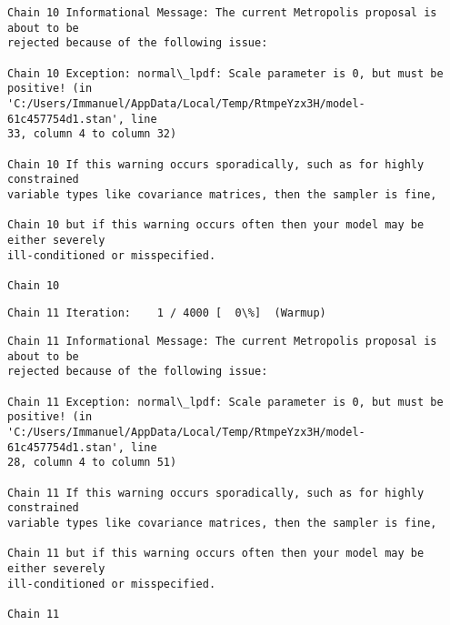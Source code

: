\documentclass[11pt]{article}
\begin{document}
    \begin{Verbatim}[commandchars=\\\{\}]
Chain 10 Informational Message: The current Metropolis proposal is about to be
rejected because of the following issue:

Chain 10 Exception: normal\_lpdf: Scale parameter is 0, but must be positive! (in
'C:/Users/Immanuel/AppData/Local/Temp/RtmpeYzx3H/model-61c457754d1.stan', line
33, column 4 to column 32)

Chain 10 If this warning occurs sporadically, such as for highly constrained
variable types like covariance matrices, then the sampler is fine,

Chain 10 but if this warning occurs often then your model may be either severely
ill-conditioned or misspecified.

Chain 10

    \end{Verbatim}

    \begin{Verbatim}[commandchars=\\\{\}]
Chain 11 Iteration:    1 / 4000 [  0\%]  (Warmup)
    \end{Verbatim}

    \begin{Verbatim}[commandchars=\\\{\}]
Chain 11 Informational Message: The current Metropolis proposal is about to be
rejected because of the following issue:

Chain 11 Exception: normal\_lpdf: Scale parameter is 0, but must be positive! (in
'C:/Users/Immanuel/AppData/Local/Temp/RtmpeYzx3H/model-61c457754d1.stan', line
28, column 4 to column 51)

Chain 11 If this warning occurs sporadically, such as for highly constrained
variable types like covariance matrices, then the sampler is fine,

Chain 11 but if this warning occurs often then your model may be either severely
ill-conditioned or misspecified.

Chain 11

    \end{Verbatim}
\end{document}
